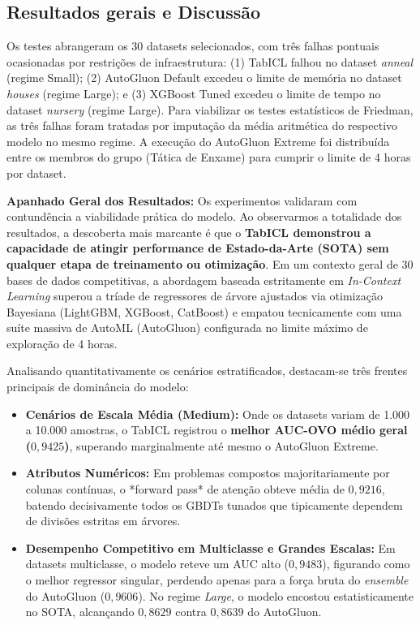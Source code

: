 \documentclass[12pt,a4paper]{article}
\begin{document}
\subsection{Resultados gerais e Discussão}
Os testes abrangeram os 30 datasets selecionados, com três falhas pontuais ocasionadas por restrições de infraestrutura: (1) TabICL falhou no dataset \textit{anneal} (regime Small); (2) AutoGluon Default excedeu o limite de memória no dataset \textit{houses} (regime Large); e (3) XGBoost Tuned excedeu o limite de tempo no dataset \textit{nursery} (regime Large). Para viabilizar os testes estatísticos de Friedman, as três falhas foram tratadas por imputação da média aritmética do respectivo modelo no mesmo regime. A execução do AutoGluon Extreme foi distribuída entre os membros do grupo (Tática de Enxame) para cumprir o limite de 4 horas por dataset.

\textbf{Apanhado Geral dos Resultados:} Os experimentos validaram com contundência a viabilidade prática do modelo. Ao observarmos a totalidade dos resultados, a descoberta mais marcante é que o \textbf{TabICL demonstrou a capacidade de atingir performance de Estado-da-Arte (SOTA) sem qualquer etapa de treinamento ou otimização}. Em um contexto geral de 30 bases de dados competitivas, a abordagem baseada estritamente em \textit{In-Context Learning} superou a tríade de regressores de árvore ajustados via otimização Bayesiana (LightGBM, XGBoost, CatBoost) e empatou tecnicamente com uma suíte massiva de AutoML (AutoGluon) configurada no limite máximo de exploração de 4 horas. 

Analisando quantitativamente os cenários estratificados, destacam-se três frentes principais de dominância do modelo:
\begin{itemize}
    \item \textbf{Cenários de Escala Média (Medium):} Onde os datasets variam de 1.000 a 10.000 amostras, o TabICL registrou o \textbf{melhor AUC-OVO médio geral ($0{,}9425$)}, superando marginalmente até mesmo o AutoGluon Extreme.
    \item \textbf{Atributos Numéricos:} Em problemas compostos majoritariamente por colunas contínuas, o *forward pass* de atenção obteve média de $0{,}9216$, batendo decisivamente todos os GBDTs tunados que tipicamente dependem de divisões estritas em árvores.
    \item \textbf{Desempenho Competitivo em Multiclasse e Grandes Escalas:} Em datasets multiclasse, o modelo reteve um AUC alto ($0{,}9483$), figurando como o melhor regressor singular, perdendo apenas para a força bruta do \textit{ensemble} do AutoGluon ($0{,}9606$). No regime \textit{Large}, o modelo encostou estatisticamente no SOTA, alcançando $0{,}8629$ contra $0{,}8639$ do AutoGluon.
\end{itemize}
\end{document}
